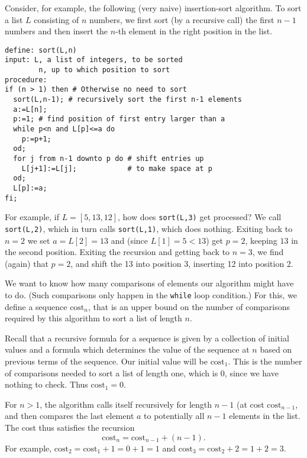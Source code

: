 Consider, for example, the following (very naive) insertion-sort algorithm.
To sort a list $L$ consisting of $n$ numbers, we first sort (by a recursive
call) the first $n-1$
numbers and then insert the $n$-th element in the right position in the list.
\begin{verbatim}
define: sort(L,n)
input: L, a list of integers, to be sorted
        n, up to which position to sort
procedure:
if (n > 1) then # Otherwise no need to sort
  sort(L,n-1); # recursively sort the first n-1 elements
  a:=L[n];
  p:=1; # find position of first entry larger than a
  while p<n and L[p]<=a do
    p:=p+1;
  od;
  for j from n-1 downto p do # shift entries up
    L[j+1]:=L[j];            # to make space at p
  od;
  L[p]:=a;
fi;
\end{verbatim}


For example, if $L = [5,13,12]$, how does \verb+sort(L,3)+ get processed?
We call \verb+sort(L,2)+, which in turn calls
\verb+sort(L,1)+, which does nothing. Exiting back to $n=2$ we set $a=L[2]=13$ and (since
$L[1]=5<13$) get $p=2$, keeping $13$ in the second position.
Exiting the recursion and getting back to $n=3$, we find (again) that $p=2$, and
shift the 13 into position 3, inserting 12 into position 2.
\smallskip

We want to know how many comparisons of elements our algorithm might have to
do. (Such comparisons only happen in the \texttt{while} loop condition.) For
this, we define a sequence $\text{cost}_n$, that is an upper bound on the
number of comparisons required by this algorithm to sort a list of length
$n$.

Recall that a recursive formula for a sequence is given by a collection of initial values
and a formula which determines the value of the sequence at $n$ based on previous
terms of the sequence.
Our initial value will be $\text{cost}_1$. This is the number of comparisons
needed to sort a list of length one, which is 0, since we have nothing to
check. Thus $\text{cost}_1 = 0$.

For $n>1$, the algorithm calls itself recursively for length $n-1$ (at cost
$\text{cost}_{n-1}$, and then compares the last element $a$ to potentially
all $n-1$ elements in the list. The cost thus satisfies the recursion
\[
\text{cost}_n = \text{cost}_{n-1} + (n-1).
\]
For example, $\text{cost}_2 = \text{cost}_1+1=0+1=1$ and $\text{cost}_3 =
\text{cost}_2+2=1+2=3$.

